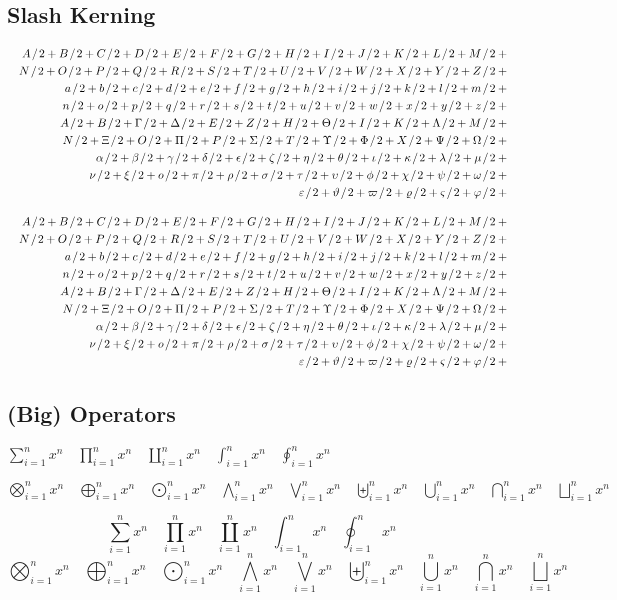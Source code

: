 \documentclass[12pt, a4paper, oneside]{article}
\newcommand*{\divslash}{%
	\mathbin{%
		\nonscript\mskip-2mu / \nonscript\mskip-2mu%
	}%
}  %
\theoremstyle{Plain}
\theoremstyle{Definition}
\theoremstyle{Remark}
\begin{document}
\begin{appendix}
\subsection{Slash Kerning \showfamily}

\def\test#1{1 \divslash #1+{}}
\begin{eqnarray*}
  && {\testupperi}\\
  && {\testupperii}\\
  && {\testloweri}\\
  && {\testlowerii}\\
  && {\testupgreeki}\\
  && {\testupgreekii}\\
  && {\testlowgreeki}\\
  && {\testlowgreekii}\\
  && {\testlowgreekiii}
\end{eqnarray*}

\def\test#1{#1 \divslash 2+{}}
\begin{eqnarray*}
  && {\testupperi}\\
  && {\testupperii}\\
  && {\testloweri}\\
  && {\testlowerii}\\
  && {\testupgreeki}\\
  && {\testupgreekii}\\
  && {\testlowgreeki}\\
  && {\testlowgreekii}\\
  && {\testlowgreekiii}
\end{eqnarray*}


\subsection{(Big) Operators \showfamily}

\def\testop#1{#1_{i=1}^{n} x^{n} \quad}
$
	\testop\sum
	\testop\prod
	\testop\coprod
	\testop\int
	\testop\oint
$

\noindent%
$
	\testop\bigotimes
	\testop\bigoplus
	\testop\bigodot
	\testop\bigwedge
	\testop\bigvee
	\testop\biguplus
	\testop\bigcup
	\testop\bigcap
	\testop\bigsqcup
$

\begin{displaymath}
  \testop\sum
  \testop\prod
  \testop\coprod
  \testop\int
  \testop\oint
\end{displaymath}
\begin{displaymath}
  \testop\bigotimes
  \testop\bigoplus
  \testop\bigodot
  \testop\bigwedge
  \testop\bigvee
  \testop\biguplus
  \testop\bigcup
  \testop\bigcap
  \testop\bigsqcup
\end{displaymath}



\end{appendix}
\end{document}
